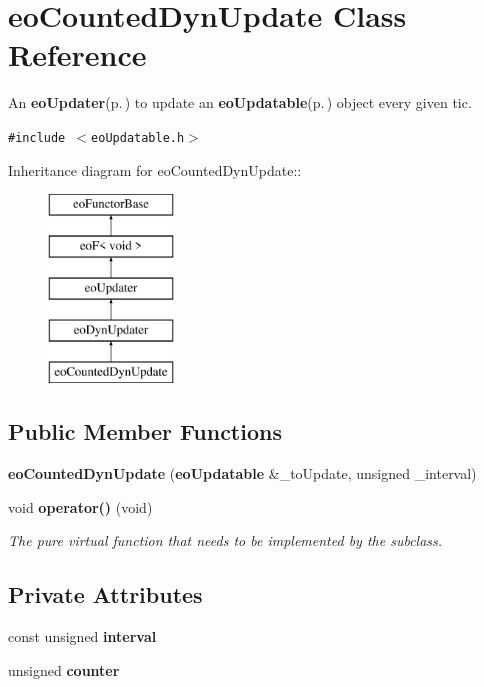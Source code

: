 \section{eo\-Counted\-Dyn\-Update Class Reference}
\label{classeo_counted_dyn_update}
An {\bf eo\-Updater}{\rm (p.\,\pageref{classeo_updater})} to update an {\bf eo\-Updatable}{\rm (p.\,\pageref{classeo_updatable})} object every given tic.  


{\tt \#include $<$eo\-Updatable.h$>$}

Inheritance diagram for eo\-Counted\-Dyn\-Update::\begin{figure}[H]
\begin{center}
\leavevmode
\includegraphics[height=5cm]{classeo_counted_dyn_update}
\end{center}
\end{figure}
\subsection*{Public Member Functions}
\begin{CompactItemize}
\item 
{\bf eo\-Counted\-Dyn\-Update} ({\bf eo\-Updatable} \&\_\-to\-Update, unsigned \_\-interval)\label{classeo_counted_dyn_update_a0}

\item 
void {\bf operator()} (void)\label{classeo_counted_dyn_update_a1}

\begin{CompactList}\small\item\em The pure virtual function that needs to be implemented by the subclass. \item\end{CompactList}\end{CompactItemize}
\subsection*{Private Attributes}
\begin{CompactItemize}
\item 
const unsigned {\bf interval}\label{classeo_counted_dyn_update_r0}

\item 
unsigned {\bf counter}\label{classeo_counted_dyn_update_r1}

\end{CompactItemize}


